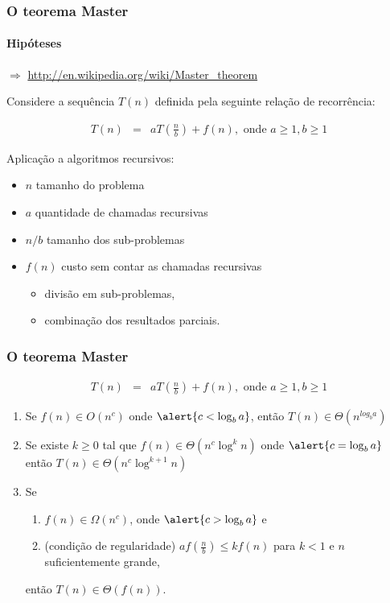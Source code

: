\documentclass[handout]{beamer}
\begin{document}
\begin{frame}
\frametitle{O teorema Master}
\framesubtitle{Hipóteses}

$\Longrightarrow$ \alert{\url{http://en.wikipedia.org/wiki/Master_theorem}}

Considere a sequência $T(n)$ definida pela seguinte relação de recorrência:

\begin{eqnarray*}
T(n) & = & a T(\frac{n}{b}) + f(n), \mbox{ onde $a \ge 1, b \ge 1$}
\end{eqnarray*}

Aplicação a algoritmos recursivos:
\begin{itemize}
\item $n$ tamanho do problema
\item $a$ quantidade de chamadas recursivas
\item $n/b$ tamanho dos sub-problemas 
\item $f(n)$ custo sem contar as chamadas recursivas
\begin{itemize}
  \item divisão em sub-problemas,
  \item combinação dos resultados parciais.
\end{itemize}
\end{itemize}

\end{frame}

\begin{frame}
\frametitle{O teorema Master}

\begin{eqnarray*}
T(n) & = & a T(\frac{n}{b}) + f(n), \mbox{ onde $a \ge 1, b \ge 1$}
\end{eqnarray*}

\begin{enumerate}

\item Se $f(n) \in O(n^{c})$ onde $\alert{c < \log_{b} a}$, 
  então $T(n) \in \Theta(n^{log_{b} a})$

\item Se existe $k \ge 0$ tal que $f(n) \in \Theta(n^{c} \log^{k} n)$ onde
  $\alert{c = \log_b a}$ então $T(n) \in \Theta(n^{c} \log^{k+1} n)$

\item Se 
\begin{enumerate} 
\item $f(n) \in \Omega(n^{c})$, onde $\alert{c > \log_{b} a}$ e
\item (condição de regularidade) $a f(\frac{n}{b}) \le k f(n)$ para $k < 1$ e $n$ suficientemente grande,
\end{enumerate}
então
$T(n) \in \Theta(f(n))$.

\end{enumerate}


\end{frame}
\end{document}
